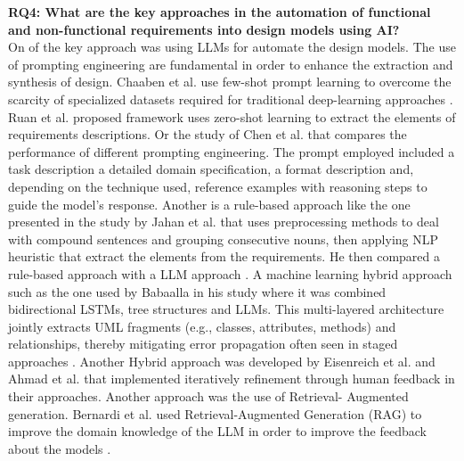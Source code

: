 \textbf{RQ4: What are the key approaches in the automation of functional and non-functional requirements into design models using AI?}
\\
On of the key approach was using LLMs for automate the design models. The use of prompting engineering are fundamental in order to enhance the extraction and synthesis of design. Chaaben et al. use few-shot prompt learning to overcome the scarcity of specialized datasets required for traditional deep-learning approaches \cite{14chaaben2023}. Ruan et al. \cite{9ruan2023} proposed framework uses zero-shot learning to extract the elements of requirements descriptions. Or the study of Chen et al. \cite{9ruan2023} that compares the performance of different prompting engineering. The prompt employed included a task description a detailed domain specification, a format description and, depending on the technique used, reference examples with reasoning steps to guide the model's response. 
Another is  a rule-based approach like the one presented in the study by Jahan et al. that uses preprocessing methods to deal with compound sentences and grouping consecutive nouns, then applying NLP heuristic that extract the elements from the requirements. He then compared a rule-based approach with a LLM approach \cite{4jahan2024}.
A machine learning hybrid approach such as the one used by Babaalla in his study where it was combined bidirectional LSTMs, tree structures and LLMs. This multi-layered architecture jointly extracts UML fragments (e.g., classes, attributes, methods) and relationships, thereby mitigating error propagation often seen in staged approaches \cite{2babaalla2024}.
Another Hybrid approach was developed by Eisenreich et al. \cite{7eisenreich2024} and Ahmad et al.  \cite{3ahmad2023} that implemented iteratively refinement through human feedback in their approaches.
Another approach was the use of Retrieval- Augmented generation. Bernardi et al. used Retrieval-Augmented Generation (RAG) to improve the domain knowledge of the LLM in order to improve the feedback about the models \cite{13benardi2024}.
